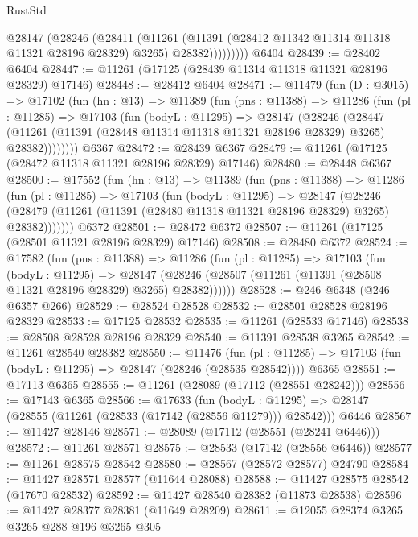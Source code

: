 \begin{lexlean}{RustStd}
\begin{coremodule}
              @28147
                (@28246
                  (@28411
                    (@11261
                      (@11391 (@28412 @11342 @11314 @11318 @11321 @28196 @28329) @3265)
                      @28382)))))))))
    @6404
@28439 := @28402 @6404
@28447 := @11261 (@17125 (@28439 @11314 @11318 @11321 @28196 @28329) @17146)
@28448 := @28412 @6404
@28471 := @11479
    (fun (D : @3015) =>
    @17102
      (fun (hn : @13) =>
      @11389
        (fun (pns : @11388) =>
        @11286
          (fun (pl : @11285) =>
          @17103
            (fun (bodyL : @11295) =>
            @28147
              (@28246
                (@28447
                  (@11261 (@11391 (@28448 @11314 @11318 @11321 @28196 @28329) @3265) @28382))))))))
    @6367
@28472 := @28439 @6367
@28479 := @11261 (@17125 (@28472 @11318 @11321 @28196 @28329) @17146)
@28480 := @28448 @6367
@28500 := @17552
    (fun (hn : @13) =>
    @11389
      (fun (pns : @11388) =>
      @11286
        (fun (pl : @11285) =>
        @17103
          (fun (bodyL : @11295) =>
          @28147
            (@28246
              (@28479 (@11261 (@11391 (@28480 @11318 @11321 @28196 @28329) @3265) @28382)))))))
    @6372
@28501 := @28472 @6372
@28507 := @11261 (@17125 (@28501 @11321 @28196 @28329) @17146)
@28508 := @28480 @6372
@28524 := @17582
    (fun (pns : @11388) =>
    @11286
      (fun (pl : @11285) =>
      @17103
        (fun (bodyL : @11295) =>
        @28147 (@28246 (@28507 (@11261 (@11391 (@28508 @11321 @28196 @28329) @3265) @28382))))))
@28528 := @246 @6348 (@246 @6357 @266)
@28529 := @28524 @28528
@28532 := @28501 @28528 @28196 @28329
@28533 := @17125 @28532
@28535 := @11261 (@28533 @17146)
@28538 := @28508 @28528 @28196 @28329
@28540 := @11391 @28538 @3265
@28542 := @11261 @28540 @28382
@28550 := @11476
    (fun (pl : @11285) => @17103 (fun (bodyL : @11295) => @28147 (@28246 (@28535 @28542))))
    @6365
@28551 := @17113 @6365
@28555 := @11261 (@28089 (@17112 (@28551 @28242)))
@28556 := @17143 @6365
@28566 := @17633
    (fun (bodyL : @11295) => @28147 (@28555 (@11261 (@28533 (@17142 (@28556 @11279))) @28542)))
    @6446
@28567 := @11427 @28146
@28571 := @28089 (@17112 (@28551 (@28241 @6446)))
@28572 := @11261 @28571
@28575 := @28533 (@17142 (@28556 @6446))
@28577 := @11261 @28575 @28542
@28580 := @28567 (@28572 @28577) @24790
@28584 := @11427 @28571 @28577 (@11644 @28088)
@28588 := @11427 @28575 @28542 (@17670 @28532)
@28592 := @11427 @28540 @28382 (@11873 @28538)
@28596 := @11427 @28377 @28381 (@11649 @28209)
@28611 := @12055
    @28374
    @3265
    @3265
    @288
    @196
    @3265
    @305

\end{coremodule}
\end{lexlean}
